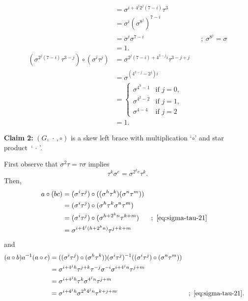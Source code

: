 \begin{xmpls}
\begin{enumerate}[\rm a)]
\begin{enumerate}[-]
\begin{align*}
                    &= \sigma^{i+4^j2^j(7-i)}\tau^3\\
                    &= \sigma^i(\sigma^{8^j})^{7-i}\\
                    &= \sigma^i\sigma^{7-i} &&;\ \sigma^{8^j}=\sigma\\
                    &= 1.\\
                (\sigma^{2^j(7-i)}\tau^{3-j})\circ(\sigma^i\tau^j)
                    &= \sigma^{2^j(7-i)+4^{3-j}i}\tau^{3-j+j}\\
                    &= \sigma^{(4^{3-j}-2^j)i}\\
                    &= \begin{cases}
                        \sigma^{4^3-1}   &\text{if }j=0,\\
                        \sigma^{4^2-2}  &\text{if }j=1,\\
                        \sigma^{4-4}    &\text{if }j=2
                    \end{cases}\\
                    &= 1.
            \end{align*}
    \end{enumerate}
    \textbf{Claim 2:} $(G,\,\cdot\,,\circ)$ is a skew left brace with multiplication `$\circ$' and star product~`$\,\cdot\,$'.
    
    First observe that $\sigma^2\tau=\tau\sigma$ implies
    \begin{equation}\label{eq:sigma-tau-21}
        \tau^k\sigma^e=\sigma^{2^ke}\tau^k.
    \end{equation}
    Then,
    \begin{align*}
        a\circ(bc) &= (\sigma^i\tau^j)
                \circ((\sigma^h\tau^k)(\sigma^n\tau^m))\\
            &= (\sigma^i\tau^j)\circ(\sigma^h\tau^k\sigma^n\tau^m)\\
            &= (\sigma^i\tau^j)\circ(\sigma^{h+2^kn}\tau^{k+m})
                    &&;\ \eqref{eq:sigma-tau-21}\\
            &= \sigma^{i+4^j(h+2^kn)}\tau^{j+k+m}
    \end{align*}
    and
    \begin{align*}
        (a\circ b)a^{-1}(a\circ c) &=
        ((\sigma^i\tau^j)\circ(\sigma^h\tau^k))(\sigma^i\tau^j)^{-1}
            ((\sigma^i\tau^j)\circ(\sigma^n\tau^m))\\
            &= \sigma^{i+4^jh}\tau^{j+k}\tau^{-j}\sigma^{-i}\sigma^{i+4^jn}
                \tau^{j+m}\\
            &= \sigma^{i+4^jh}\tau^k\sigma^{4^jn}\tau^{j+m}\\
            &= \sigma^{i+4^jh}\sigma^{2^k4^jn}\tau^{k+j+m}
                    &&;\ \eqref{eq:sigma-tau-21}.
    \end{align*}


\end{enumerate}
\end{xmpls}
